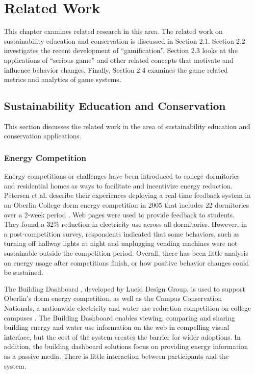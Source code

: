 \chapter{Related Work}
\label{cha:related-work}

This chapter examines related research in this area. The related work on sustainability education and conservation is discussed in Section 2.1. Section 2.2 investigates the recent development of ``gamification''. Section 2.3 looks at the applications of ``serious game'' and other related concepts that motivate and influence behavior changes. Finally, Section 2.4 examines the game related metrics and analytics of game systems.

\section {Sustainability Education and Conservation}
This section discusses the related work in the area of sustainability education and conservation applications.

\subsection{Energy Competition}
Energy competitions or challenges have been introduced to college dormitories
and residential homes as ways to facilitate and incentivize energy reduction.
Petersen et al. describe their experiences deploying a real-time feedback
system in an Oberlin College dorm energy competition in 2005 that includes 22
dormitories over a 2-week period \cite{petersen-dorm-energy-reduction}. Web
pages were used to provide feedback to students. They found a 32\% reduction in
electricity use across all dormitories. However, in a post-competition survey,
respondents indicated that some behaviors, such as turning off hallway lights
at night and unplugging vending machines were not sustainable outside the
competition period.  Overall, there has been little analysis on energy usage
after competitions finish, or how positive behavior changes could be sustained.

The Building Dashboard \cite{building-dashboard}, developed by Lucid Design
Group, is used to support Oberlin's dorm energy competition,
as well as the Campus Conservation Nationals, a nationwide electricity and
water use reduction competition on college campuses \cite{competetoreduce}.
The Building Dashboard enables viewing, comparing and sharing building energy
and water use information on the web in compelling visual interface, but the
cost of the system creates the barrier for wider adoptions. In addition, the
building dashboard solutions focus on providing energy information as
a passive media. There is little interaction between participants and the system.

